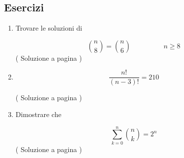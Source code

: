 \subsection{Esercizi}

\begin{enumerate}
\item

Trovare le soluzioni di

\begin{equation*}
\binom{n}{8}=\binom{n}{6} \hspace{2cm} n \geq 8
\end{equation*}
( Soluzione a pagina \pageref{combs_01} \label{combl_01} )



\item 

\begin{equation*}
\frac{n!}{(n-3)!} = 210
\end{equation*}

( Soluzione a pagina \pageref{combs_02} \label{combl_02} )

\item
Dimostrare che 

\begin{equation*}
\sum_{k=0}^{n}{\binom{n}{k}}=2^n
\end{equation*}
( Soluzione a pagina \pageref{combs_03} \label{combl_03} )
\end{enumerate}
